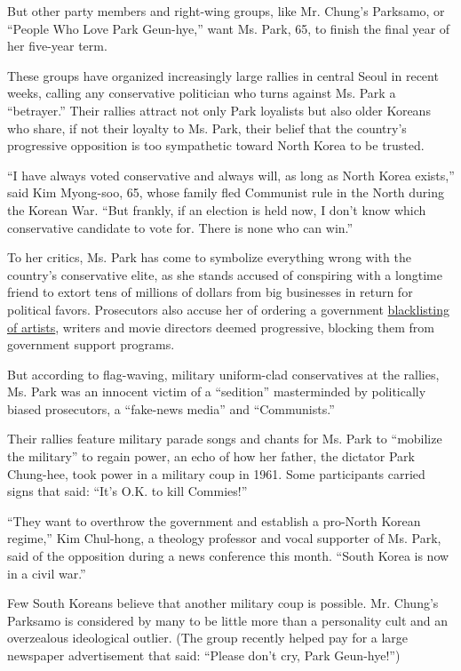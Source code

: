 But other party members and right-wing groups, like Mr. Chung's
Parksamo, or ``People Who Love Park Geun-hye,'' want Ms. Park, 65, to
finish the final year of her five-year term.

These groups have organized increasingly large rallies in central Seoul
in recent weeks, calling any conservative politician who turns against
Ms. Park a ``betrayer.'' Their rallies attract not only Park loyalists
but also older Koreans who share, if not their loyalty to Ms. Park,
their belief that the country's progressive opposition is too
sympathetic toward North Korea to be trusted.

``I have always voted conservative and always will, as long as North
Korea exists,'' said Kim Myong-soo, 65, whose family fled Communist rule
in the North during the Korean War. ``But frankly, if an election is
held now, I don't know which conservative candidate to vote for. There
is none who can win.''

To her critics, Ms. Park has come to symbolize everything wrong with the
country's conservative elite, as she stands accused of conspiring with a
longtime friend to extort tens of millions of dollars from big
businesses in return for political favors. Prosecutors also accuse her
of ordering a government
\href{https://www.nytimes3xbfgragh.onion/2017/01/12/world/asia/south-korea-president-park-blacklist-artists.html}{blacklisting
of artists}, writers and movie directors deemed progressive, blocking
them from government support programs.

But according to flag-waving, military uniform-clad conservatives at the
rallies, Ms. Park was an innocent victim of a ``sedition'' masterminded
by politically biased prosecutors, a ``fake-news media'' and
``Communists.''

Their rallies feature military parade songs and chants for Ms. Park to
``mobilize the military'' to regain power, an echo of how her father,
the dictator Park Chung-hee, took power in a military coup in 1961. Some
participants carried signs that said: ``It's O.K. to kill Commies!''

``They want to overthrow the government and establish a pro-North Korean
regime,'' Kim Chul-hong, a theology professor and vocal supporter of Ms.
Park, said of the opposition during a news conference this month.
``South Korea is now in a civil war.''

Few South Koreans believe that another military coup is possible. Mr.
Chung's Parksamo is considered by many to be little more than a
personality cult and an overzealous ideological outlier. (The group
recently helped pay for a large newspaper advertisement that said:
``Please don't cry, Park Geun-hye!'')

